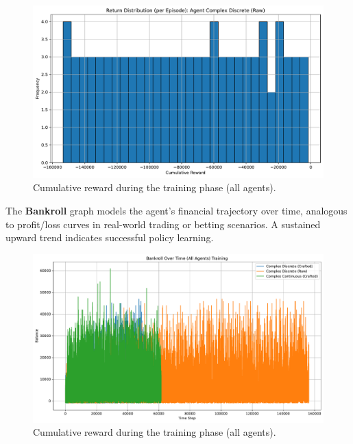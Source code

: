 \documentclass[sigconf]{acmart}
\begin{document}
\begin{figure}[t]
  \centering
  \includegraphics[width=\textwidth]{return_distribution_Complex Discrete (Raw).pdf}
  \caption{Cumulative reward during the training phase (all agents).}
  \label{fig:return_distribution_Complex Discrete (Raw)}
\end{figure}

The \textbf{Bankroll} graph models the agent's financial trajectory over time, analogous to profit/loss curves in real-world trading or betting scenarios. A sustained upward trend indicates successful policy learning. 

\begin{figure}[t]
  \centering
  \includegraphics[width=\textwidth]{bankroll_all_training.pdf}
  \caption{Cumulative reward during the training phase (all agents).}
  \label{fig:bankroll_all_training}
\end{figure}
\end{document}
